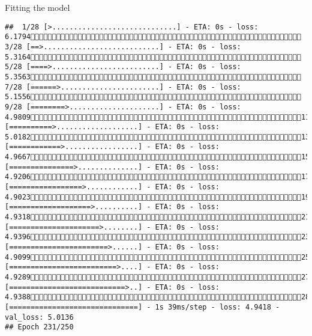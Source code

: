 \documentclass[
  ignorenonframetext,
]{beamer}
\begin{document}
\begin{frame}[fragile]{Fitting the model}
\begin{verbatim}
##  1/28 [>.............................] - ETA: 0s - loss: 6.1794 3/28 [==>...........................] - ETA: 0s - loss: 5.3164 5/28 [====>.........................] - ETA: 0s - loss: 5.3563 7/28 [======>.......................] - ETA: 0s - loss: 5.1556 9/28 [========>.....................] - ETA: 0s - loss: 4.980911/28 [==========>...................] - ETA: 0s - loss: 5.018213/28 [============>.................] - ETA: 0s - loss: 4.966715/28 [===============>..............] - ETA: 0s - loss: 4.920617/28 [=================>............] - ETA: 0s - loss: 4.902319/28 [===================>..........] - ETA: 0s - loss: 4.931821/28 [=====================>........] - ETA: 0s - loss: 4.939623/28 [=======================>......] - ETA: 0s - loss: 4.909925/28 [=========================>....] - ETA: 0s - loss: 4.928927/28 [===========================>..] - ETA: 0s - loss: 4.938828/28 [==============================] - 1s 39ms/step - loss: 4.9418 - val_loss: 5.0136
## Epoch 231/250

\end{verbatim}
\end{frame}
\end{document}
